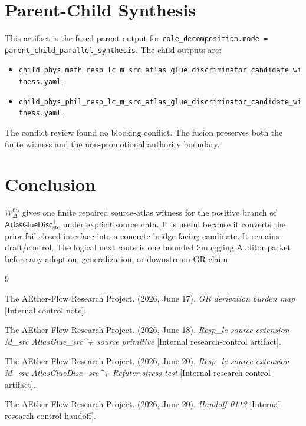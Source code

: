 \documentclass[11pt]{article}
\newcommand{\AtlasGlueDisc}{\mathsf{AtlasGlueDisc}_{\mathrm{src}}^{+}}
\newcommand{\Wfin}{W_{\Delta}^{\mathrm{fin}}}
\begin{document}
\section{Parent-Child Synthesis}

This artifact is the fused parent output for
\texttt{role\_decomposition.mode = parent\_child\_parallel\_synthesis}. The
child outputs are:
\begin{itemize}
  \item \texttt{child\_phys\_math\_resp\_lc\_m\_src\_atlas\_glue\_discriminator\_candidate\_witness.yaml};
  \item \texttt{child\_phys\_phil\_resp\_lc\_m\_src\_atlas\_glue\_discriminator\_candidate\_witness.yaml}.
\end{itemize}
The conflict review found no blocking conflict. The fusion preserves both the
finite witness and the non-promotional authority boundary.

\section{Conclusion}

\(\Wfin\) gives one finite repaired source-atlas witness for the positive
branch of \(\AtlasGlueDisc\) under explicit source data. It is useful because
it converts the prior fail-closed interface into a concrete bridge-facing
candidate. It remains draft/control. The logical next route is one bounded
Smuggling Auditor packet before any adoption, generalization, or downstream GR
claim.

\begin{thebibliography}{9}

The AEther-Flow Research Project. (2026, June 17). \emph{GR derivation burden
map} [Internal control note].

The AEther-Flow Research Project. (2026, June 18). \emph{Resp\_lc
source-extension M\_src AtlasGlue\_src\^{}+ source primitive} [Internal
research-control artifact].

The AEther-Flow Research Project. (2026, June 20). \emph{Resp\_lc
source-extension M\_src AtlasGlueDisc\_src\^{}+ Refuter stress test}
[Internal research-control artifact].

The AEther-Flow Research Project. (2026, June 20). \emph{Handoff 0113}
[Internal research-control handoff].

\end{thebibliography}
\end{document}
